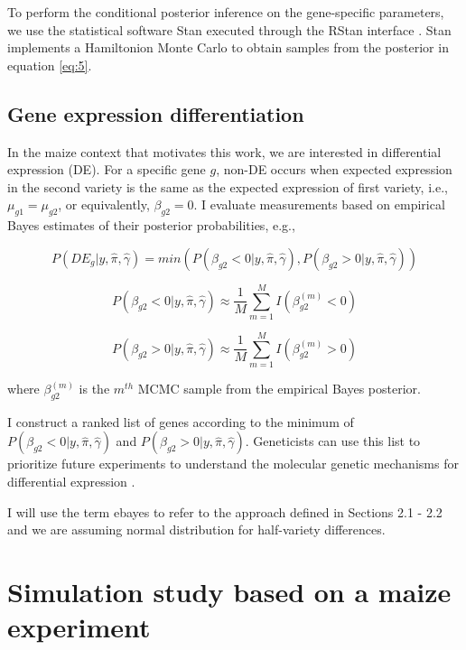 \documentclass[11pt]{isuthesis}
\begin{document}
To perform the conditional posterior inference on the gene-specific parameters, we use the statistical software Stan \citep{stan2014stan} executed through the RStan interface \citep{team2016rstan}. Stan implements a Hamiltonion Monte Carlo \citep{neal2011mcmc} to obtain samples from the posterior in equation \ref{eq:5}. 


\subsection{Gene expression differentiation}

In the maize context that motivates this work, we are interested in differential expression (DE). For a specific gene $g$, non-DE occurs when expected expression in the second variety is the same as the expected expression of first variety, i.e., $\mu_{g1} = \mu_{g2}$, or equivalently, $\beta_{g2}=0$.  I evaluate measurements based on empirical Bayes estimates of their posterior probabilities, e.g., 

\begin{equation}
\label{eq:6}
P(DE_g | y, \hat{\pi}, \hat{\gamma}) =min( P(\beta_{g2}< 0 | y, \hat{\pi}, \hat{\gamma}),  P(\beta_{g2}> 0 | y, \hat{\pi}, \hat{\gamma}))
\end{equation}

$$P(\beta_{g2}< 0 | y, \hat{\pi}, \hat{\gamma}) \approx \frac{1}{M} \sum_{m=1}^M I(\beta_{g2} ^ {(m)} < 0)$$

$$P(\beta_{g2}> 0 | y, \hat{\pi}, \hat{\gamma}) \approx \frac{1}{M} \sum_{m=1}^M I(\beta_{g2} ^ {(m)} > 0) $$

where $\beta_{g2}^{(m)}$ is the $m^{th}$ MCMC sample from the empirical Bayes posterior.



I construct a ranked list of genes according to the minimum of $P(\beta_{g2}< 0 | y, \hat{\pi}, \hat{\gamma})$ and $P(\beta_{g2}> 0 | y, \hat{\pi}, \hat{\gamma})$. Geneticists can use this list to prioritize future experiments to understand the molecular genetic mechanisms for differential expression \citep{niemi2015empirical}. 

I will use the term ebayes to refer to the approach defined in Sections 2.1 - 2.2 and we are assuming normal distribution for half-variety differences.


\section{Simulation study based on a maize experiment}
\end{document}
